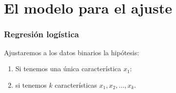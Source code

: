 \documentclass{beamer}
\begin{document}
   \section{El modelo para el ajuste}
 \begin{frame}\frametitle{Regresión logística}
   Ajustaremos a los datos binarios la hipótesis:        \begin{center}
        \end{center}  

   \begin{enumerate}
   \item<2-> Si tenemos una única característica $x_1$:
        \begin{center}
        \end{center}  
      \item<3->  si tenemos $k$ características $x_1,x_2,\ldots,x_k$. 
        \begin{center}
        \end{center}  
   \end{enumerate}
   \end{frame}
 
\end{document}
